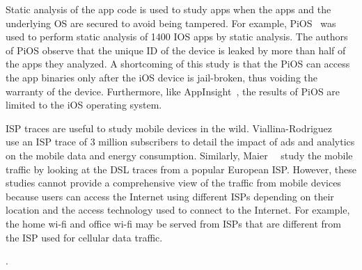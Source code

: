 Static analysis of the app code is used to study apps when the apps and the underlying OS are secured to avoid being tampered. 
For example, PiOS~\cite{egele:pios} was used to perform static analysis of 1400 IOS apps by static analysis. 
The authors of PiOS observe that the unique ID of the device is leaked by more than half of the apps they analyzed. 
A shortcoming of this study is that the PiOS can access the app binaries only after the iOS device is jail-broken, thus voiding the warranty of the device.
Furthermore, like AppInsight~\cite{ravindranath:appinsight}, the results of PiOS are limited to the iOS operating system. 

ISP traces are useful to study mobile devices in the wild. 
Viallina-Rodriguez~\etal~\cite{vallina-rod:ads} use an ISP trace of 3 million subscribers to detail the impact of ads and analytics on the mobile data and energy consumption. 
Similarly, Maier~\etal~\cite{maier:mobtraffic} study the mobile traffic by looking at the DSL traces from a popular European ISP. 
However, these studies cannot provide a comprehensive view of the traffic from mobile devices because users can access the Internet using different ISPs depending on their location and the access technology used to connect to the Internet. 
For example, the home wi-fi and office wi-fi may be served from ISPs that are different from the ISP used for cellular
data traffic. 

. 
 





